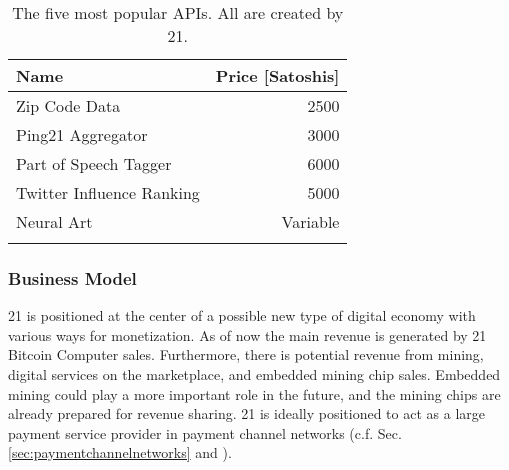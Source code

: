 \begin{table}
\centering
\begin{tabular}{lr}
    \toprule
    Name & Price [Satoshis] \\
    \midrule
    Zip Code Data & 2500 \\
    Ping21 Aggregator & 3000 \\
    Part of Speech Tagger & 6000 \\
    Twitter Influence Ranking & 5000 \\
    Neural Art & Variable \\
    \bottomrule
    \label{tbl:21marketplace}
  \end{tabular}
  \caption{The five most popular APIs. All are created by 21.}
  \end{table}
 








\subsubsection{Business Model}

21 is positioned at the center of a possible new type of digital economy with various ways for monetization. As of now the main revenue is generated by 21 Bitcoin Computer sales. Furthermore, there is potential revenue from mining, digital services on the marketplace, and embedded mining chip sales. Embedded mining could play a more important role in the future, and the mining chips are already prepared for revenue sharing. 21 is ideally positioned to act as a large payment service provider in payment channel networks (c.f. Sec. \ref{sec:paymentchannelnetworks} and \cite{decker2015Duplex}).


